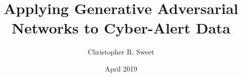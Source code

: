 

\graphicspath{{figs/}
	{01_introduction/figs/}
	{02_related_works/figs/}
	{03_methodology/figs/}
	{04_design_implementation/figs/}
	{05_results_and_analysis/figs/}
}

\author{Christopher R. Sweet}
\title{Applying Generative Adversarial Networks to Cyber-Alert Data}
\date{April 2019}





\makeglossaries
{}

\makeindex

% 


	
	
	
	
	
	
	
	
	
	
	

